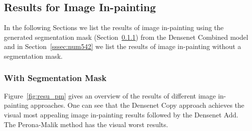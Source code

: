 \subsection{Results for Image In-painting}
\label{ssec:num54}

In the following Sections we list the results of image in-painting using the generated segmentation mask (Section~\ref{sssec:num541}) from the Densenet Combined model and in Section~\ref{sssec:num542} we list the results of image in-painting without a segmentation mask.

\subsubsection{With Segmentation Mask}
\label{sssec:num541}

Figure~\ref{fig:resu_pm} gives an overview of the results of different image in-painting approaches. One can see that the Densenet Copy approach achieves the visual most appealing image in-painting results followed by the Densenet Add. The Perona-Malik method has the visual worst results.

